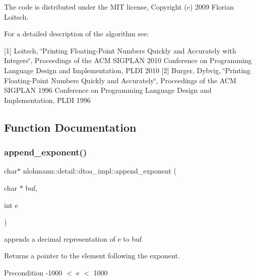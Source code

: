 The code is distributed under the M\+IT license, Copyright (c) 2009 Florian Loitsch.

For a detailed description of the algorithm see\+:

\mbox{[}1\mbox{]} Loitsch, \char`\"{}\+Printing Floating-\/\+Point Numbers Quickly and Accurately with
    Integers\char`\"{}, Proceedings of the A\+CM S\+I\+G\+P\+L\+AN 2010 Conference on Programming Language Design and Implementation, P\+L\+DI 2010 \mbox{[}2\mbox{]} Burger, Dybvig, \char`\"{}\+Printing Floating-\/\+Point Numbers Quickly and Accurately\char`\"{}, Proceedings of the A\+CM S\+I\+G\+P\+L\+AN 1996 Conference on Programming Language Design and Implementation, P\+L\+DI 1996 

\subsection{Function Documentation}
\mbox{\label{namespacenlohmann_1_1detail_1_1dtoa__impl_a84733638b826eda624488f5fa4521e0b}} 
\subsubsection{\texorpdfstring{append\+\_\+exponent()}{append\_exponent()}}
{\footnotesize\ttfamily char$\ast$ nlohmann\+::detail\+::dtoa\+\_\+impl\+::append\+\_\+exponent (\begin{DoxyParamCaption}\item[{char $\ast$}]{buf,  }\item[{int}]{e }\end{DoxyParamCaption})\hspace{0.3cm}{\ttfamily [inline]}}



appends a decimal representation of e to buf 

\begin{DoxyReturn}{Returns}
a pointer to the element following the exponent. 
\end{DoxyReturn}
\begin{DoxyPrecond}{Precondition}
-\/1000 $<$ e $<$ 1000 
\end{DoxyPrecond}
\mbox{\label{namespacenlohmann_1_1detail_1_1dtoa__impl_a22b6e37654ac93c6d0d9c06ec1bf5ded}} 
